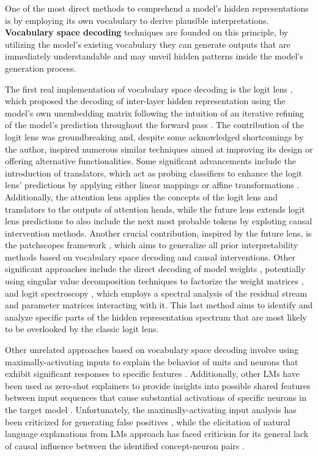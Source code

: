 One of the most direct methods to comprehend a model's hidden representations is by employing its own vocabulary to derive plausible interpretations. \textbf{Vocabulary space decoding} techniques are founded on this principle, by utilizing the model's existing vocabulary they can generate outputs that are immediately understandable and may unveil hidden patterns inside the model's generation process.

The first real implementation of vocabulary space decoding is the logit lens \cite{nostalgebraist2020}, which proposed the decoding of inter-layer hidden representation using the model's own unembedding matrix following the intuition of an iterative refining of the model's prediction throughout the forward pass \cite{jastrzebski2017}.
The contribution of the logit lens was groundbreaking and, despite some acknowledged shortcomings by the author, inspired numerous similar techniques aimed at improving its design or offering alternative functionalities.
Some significant advancements include the introduction of translators, which act as probing classifiers to enhance the logit lens' predictions by applying either linear mappings \cite{din2024} or affine transformations \cite{belrose2023a}.
Additionally, the attention lens \cite{sakarvadia2023} applies the concepts of the logit lens and translators to the outputs of attention heads, while the future lens \cite{pal2023} extends logit lens predictions to also include the next most probable tokens by exploting causal intervention methods.
Another crucial contribution, inspired by the future lens, is the patchscopes framework \cite{ghandeharioun2024}, which aims to generalize all prior interpretability methods based on vocabulary space decoding and causal interventions.
Other significant approaches include the direct decoding of model weights \cite{dar2023}, potentially using singular value decomposition techniques to factorize the weight matrices \cite{millidge2022}, and logit spectroscopy \cite{cancedda2024}, which employs a spectral analysis of the residual stream and parameter matrices interacting with it.
This last method aims to identify and analyze specific parts of the hidden representation spectrum that are most likely to be overlooked by the classic logit lens.


Other unrelated approaches based on vocabulary space decoding involve using maximally-activating inputs to explain the behavior of units and neurons that exhibit significant responses to specific features \cite{dalvi2018}.
Additionally, other LMs have been used as zero-shot explainers to provide insights into possible shared features between input sequences that cause substantial activations of specific neurons in the target model \cite{bills2023}.
Unfortunately, the maximally-activating input analysis has been criticized for generating false positives \cite{bolukbasi2021}, while the elicitation of natural language explanations from LMs approach has faced criticism for its general lack of causal influence between the identified concept-neuron pairs \cite{huang2023}.